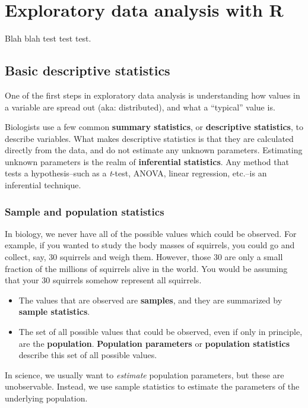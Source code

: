 \documentclass[
  13,
  letterpaper,
]{report}
\begin{document}
\part{Exploratory data analysis with R}

Blah blah test test test.

\chapter{Basic descriptive statistics}\label{sec-desc}

One of the first steps in exploratory data analysis is understanding how
values in a variable are spread out (aka: distributed), and what a
``typical'' value is.

Biologists use a few common \textbf{summary statistics}, or
\textbf{descriptive statistics}, to describe variables. What makes
descriptive statistics is that they are calculated directly from the
data, and do not estimate any unknown parameters. Estimating unknown
parameters is the realm of \textbf{inferential statistics}. Any method
that tests a hypothesis--such as a \emph{t}-test, ANOVA, linear
regression, etc.--is an inferential technique.

\section{Sample and population statistics}\label{sec-desc-sp}

In biology, we never have all of the possible values which could be
observed. For example, if you wanted to study the body masses of
squirrels, you could go and collect, say, 30 squirrels and weigh them.
However, those 30 are only a small fraction of the millions of squirrels
alive in the world. You would be assuming that your 30 squirrels somehow
represent all squirrels.

\begin{itemize}
\item
  The values that are observed are \textbf{samples}, and they are
  summarized by \textbf{sample statistics}.
\item
  The set of all possible values that could be observed, even if only in
  principle, are the \textbf{population}. \textbf{Population parameters}
  or \textbf{population statistics} describe this set of all possible
  values.
\end{itemize}

In science, we usually want to \emph{estimate} population parameters,
but these are unobservable. Instead, we use sample statistics to
estimate the parameters of the underlying population.
\end{document}
